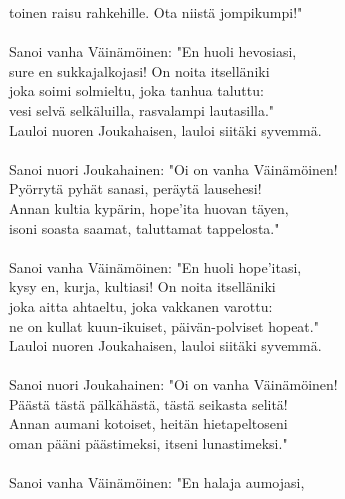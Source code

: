 toinen raisu rahkehille. Ota niistä jompikumpi!"              \\
                                                              \\
Sanoi vanha Väinämöinen: "En huoli hevosiasi,                 \\
sure en sukkajalkojasi! On noita itselläniki                  \\
joka soimi solmieltu, joka tanhua taluttu:                    \\
vesi selvä selkäluilla, rasvalampi lautasilla."               \\
Lauloi nuoren Joukahaisen, lauloi siitäki syvemmä.            \\
                                                              \\
Sanoi nuori Joukahainen: "Oi on vanha Väinämöinen!            \\
Pyörrytä pyhät sanasi, peräytä lausehesi!                     \\
Annan kultia kypärin, hope'ita huovan täyen,                  \\
isoni soasta saamat, taluttamat tappelosta."                  \\
                                                              \\
Sanoi vanha Väinämöinen: "En huoli hope'itasi,                \\
kysy en, kurja, kultiasi! On noita itselläniki                \\
joka aitta ahtaeltu, joka vakkanen varottu:                   \\
ne on kullat kuun-ikuiset, päivän-polviset hopeat."           \\
Lauloi nuoren Joukahaisen, lauloi siitäki syvemmä.            \\
                                                              \\
Sanoi nuori Joukahainen: "Oi on vanha Väinämöinen!            \\
Päästä tästä pälkähästä, tästä seikasta selitä!               \\
Annan aumani kotoiset, heitän hietapeltoseni                  \\
oman pääni päästimeksi, itseni lunastimeksi."                 \\
                                                              \\
Sanoi vanha Väinämöinen: "En halaja aumojasi,                 \\
